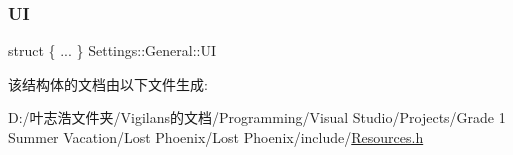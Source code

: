 \subsubsection{\texorpdfstring{UI}{UI}}
{\footnotesize\ttfamily struct \{ ... \}   Settings\+::\+General\+::\+UI}



该结构体的文档由以下文件生成\+:\begin{DoxyCompactItemize}
\item 
D\+:/叶志浩文件夹/\+Vigilans的文档/\+Programming/\+Visual Studio/\+Projects/\+Grade 1 Summer Vacation/\+Lost Phoenix/\+Lost Phoenix/include/\hyperlink{_resources_8h}{Resources.\+h}\end{DoxyCompactItemize}
